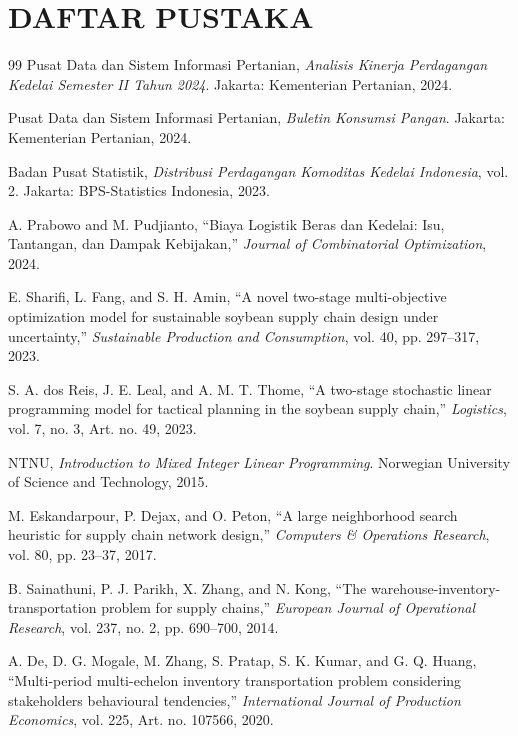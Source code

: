 \documentclass[journal]{IEEEtran}
\theoremstyle{definition}
\theoremstyle{definition}
\theoremstyle{plain}
\begin{document}
    \section*{DAFTAR PUSTAKA}
    \begin{thebibliography}{99}
    Pusat Data dan Sistem Informasi Pertanian, \textit{Analisis Kinerja Perdagangan Kedelai Semester II Tahun 2024}. Jakarta: Kementerian Pertanian, 2024.

    Pusat Data dan Sistem Informasi Pertanian, \textit{Buletin Konsumsi Pangan}. Jakarta: Kementerian Pertanian, 2024.

    Badan Pusat Statistik, \textit{Distribusi Perdagangan Komoditas Kedelai Indonesia}, vol. 2. Jakarta: BPS-Statistics Indonesia, 2023.

    A. Prabowo and M. Pudjianto, ``Biaya Logistik Beras dan Kedelai: Isu, Tantangan, dan Dampak Kebijakan,'' \textit{Journal of Combinatorial Optimization}, 2024.

    E. Sharifi, L. Fang, and S. H. Amin, ``A novel two-stage multi-objective optimization model for sustainable soybean supply chain design under uncertainty,'' \textit{Sustainable Production and Consumption}, vol. 40, pp. 297--317, 2023.

    S. A. dos Reis, J. E. Leal, and A. M. T. Thome, ``A two-stage stochastic linear programming model for tactical planning in the soybean supply chain,'' \textit{Logistics}, vol. 7, no. 3, Art. no. 49, 2023.

    NTNU, \textit{Introduction to Mixed Integer Linear Programming}. Norwegian University of Science and Technology, 2015.

    M. Eskandarpour, P. Dejax, and O. Peton, ``A large neighborhood search heuristic for supply chain network design,'' \textit{Computers \& Operations Research}, vol. 80, pp. 23--37, 2017.

    B. Sainathuni, P. J. Parikh, X. Zhang, and N. Kong, ``The warehouse-inventory-transportation problem for supply chains,'' \textit{European Journal of Operational Research}, vol. 237, no. 2, pp. 690--700, 2014.

    A. De, D. G. Mogale, M. Zhang, S. Pratap, S. K. Kumar, and G. Q. Huang, ``Multi-period multi-echelon inventory transportation problem considering stakeholders behavioural tendencies,'' \textit{International Journal of Production Economics}, vol. 225, Art. no. 107566, 2020.


\end{thebibliography}
\end{document}
